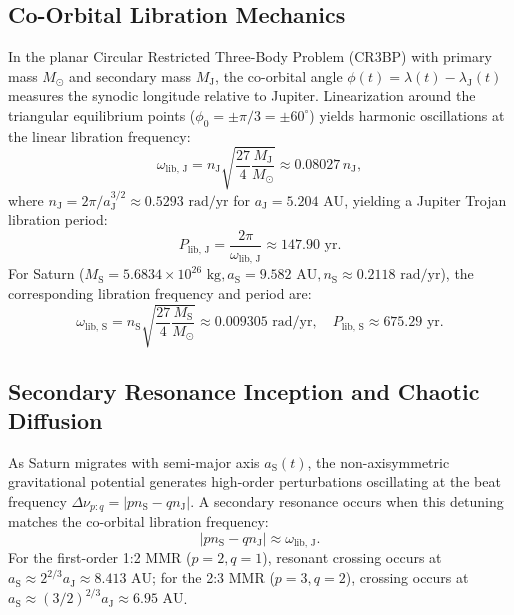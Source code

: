 \documentclass[11pt,a4paper]{article}
\begin{document}
\subsection{Co-Orbital Libration Mechanics}
In the planar Circular Restricted Three-Body Problem (CR3BP) with primary mass $M_\odot$ and secondary mass $M_{\text{J}}$, the co-orbital angle $\phi(t) = \lambda(t) - \lambda_{\text{J}}(t)$ measures the synodic longitude relative to Jupiter. Linearization around the triangular equilibrium points ($\phi_0 = \pm \pi/3 = \pm 60^\circ$) yields harmonic oscillations at the linear libration frequency:
\begin{equation}
\omega_{\text{lib, J}} = n_{\text{J}} \sqrt{\frac{27}{4} \frac{M_{\text{J}}}{M_\odot}} \approx 0.08027 \, n_{\text{J}},
\end{equation}
where $n_{\text{J}} = 2\pi / a_{\text{J}}^{3/2} \approx 0.5293\text{ rad/yr}$ for $a_{\text{J}} = 5.204\text{ AU}$, yielding a Jupiter Trojan libration period:
\begin{equation}
P_{\text{lib, J}} = \frac{2\pi}{\omega_{\text{lib, J}}} \approx 147.90\text{ yr}.
\end{equation}
For Saturn ($M_{\text{S}} = 5.6834 \times 10^{26}\text{ kg}, a_{\text{S}} = 9.582\text{ AU}, n_{\text{S}} \approx 0.2118\text{ rad/yr}$), the corresponding libration frequency and period are:
\begin{equation}
\omega_{\text{lib, S}} = n_{\text{S}} \sqrt{\frac{27}{4} \frac{M_{\text{S}}}{M_\odot}} \approx 0.009305\text{ rad/yr}, \quad P_{\text{lib, S}} \approx 675.29\text{ yr}.
\end{equation}

\subsection{Secondary Resonance Inception and Chaotic Diffusion}
As Saturn migrates with semi-major axis $a_{\text{S}}(t)$, the non-axisymmetric gravitational potential generates high-order perturbations oscillating at the beat frequency $\Delta \nu_{p:q} = |p n_{\text{S}} - q n_{\text{J}}|$. A secondary resonance occurs when this detuning matches the co-orbital libration frequency:
\begin{equation}
|p n_{\text{S}} - q n_{\text{J}}| \approx \omega_{\text{lib, J}}.
\end{equation}
For the first-order 1:2 MMR ($p=2, q=1$), resonant crossing occurs at $a_{\text{S}} \approx 2^{2/3} a_{\text{J}} \approx 8.413\text{ AU}$; for the 2:3 MMR ($p=3, q=2$), crossing occurs at $a_{\text{S}} \approx (3/2)^{2/3} a_{\text{J}} \approx 6.95\text{ AU}$.
\end{document}
